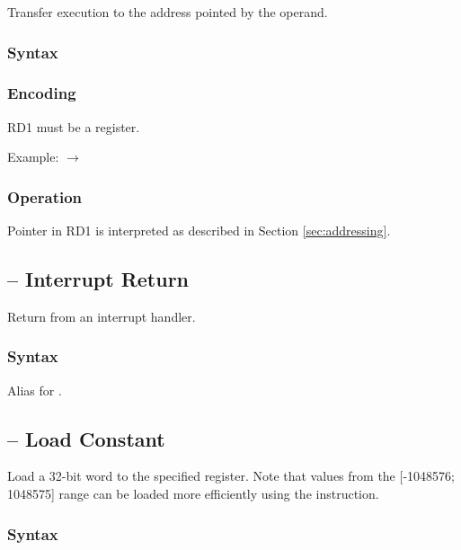 \documentclass[a4paper,12pt,twoside,extrafontsizes]{memoir}
\begin{document}
{Transfer execution to the address pointed by the operand.

\subsubsection{Syntax}


\subsubsection{Encoding}


RD1 must be a register.

Example:  $\rightarrow$ 

\subsubsection{Operation}


Pointer in RD1 is interpreted as described in Section \ref{sec:addressing}.

\subsection{ -- Interrupt Return}
\label{subsec:instr:iret}

Return from an interrupt handler.

\subsubsection{Syntax}


Alias for .

\subsection{ -- Load Constant}
\label{subsec:instr:lc}

Load a 32-bit word to the specified register. Note that values from the [-1048576; 1048575] range can be loaded more efficiently using the  instruction.

\subsubsection{Syntax}

}
\end{document}
